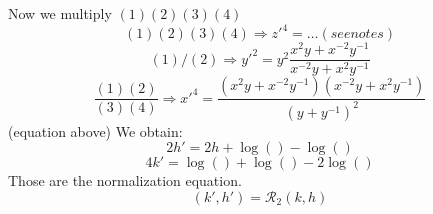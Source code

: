 \documentclass[../main/main.tex]{subfiles}
\begin{document}
Now we multiply \( (1)(2)(3)(4) \)
\begin{equation}
  (1)(2)(3)(4) \Rightarrow  z'^{4} = \dots (see notes)
\end{equation}
\begin{equation}
  (1)/(2) \Rightarrow y'^2 = y^2 \frac{x^2 y + x^{-2} y^{-1}}{ x^{-2}y + x^2 y^{-1}}
\end{equation}
\begin{equation}
  \frac{(1)(2)}{(3)(4)} \Rightarrow x'^4 = \frac{(x^2 y + x^{-2} y^{-1} ) (x^{-2}y + x^2 y^{-1}) }{(y+y^{-1})^2}
\end{equation}
(equation above)
We obtain:
\begin{equation}
  2 h' = 2 h + \log() - \log()
\end{equation}
\begin{equation}
  4 k' = \log() + \log() - 2\log()
\end{equation}
Those are the normalization equation.
\begin{equation}
  (k',h') = \mathcal{R}_2 (k,h)
\end{equation}
\end{document}
